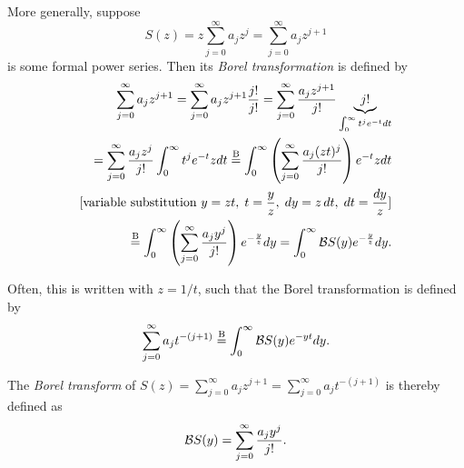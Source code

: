 More generally, suppose
\begin{equation}
S(z)= z \sum_{j=0}^\infty
a_j  z^j  = \sum_{j=0}^\infty
a_j  z^{j+1}
\label{2018-m-ch-ds-fps}
\end{equation}
is some formal power series.
Then  its {\em Borel transformation}
is defined by
\begin{equation}
\begin{split}
\sum_{j=0}^\infty
a_j z^{j+1}
=
\sum_{j=0}^\infty
a_j z^{j+1}  \frac{j!}{j!}
=
\sum_{j=0}^\infty
  \frac{a_j z^{j+1} }{j!}  \underbrace{j!}_{ \int_0^\infty t^j e^{-t}   dt }  \\
=
\sum_{j=0}^\infty
  \frac{a_jz^{j} }{j!}  \int_0^\infty t^j e^{-t} z dt
\stackrel{{\rm B}}{=}
\int_0^\infty \left(\sum_{j=0}^\infty   \frac{a_j (z t)^j}{j!}\right)  e^{-t} z dt \\
[\textrm{variable substitution }  y= z t, \; t = \frac{y}{z}  , \; dy = z \,dt, \; dt = \frac{dy}{z}]\\
\stackrel{{\rm B}}{=}
\int_0^\infty \left(\sum_{j=0}^\infty   \frac{a_j y^j}{j!}\right)  e^{-\frac{y}{z}}   dy  =
\int_0^\infty {\cal B}S (y)  e^{-\frac{y}{z}}   dy
.
\end{split}
\label{2012-m-ch-dsboreltrafo}
\end{equation}

Often, this is written with $z=1/t$, such that the  Borel transformation
is defined by
\begin{equation}
\begin{split}
\sum_{j=0}^\infty
a_j t^{-(j+1)}
\stackrel{{\rm B}}{=}
\int_0^\infty {\cal B}S (y)  e^{- yt }   dy
.
\end{split}
\label{2012-m-ch-dsboreltrafo2}
\end{equation}

The {\em Borel transform}
of   $S(z)=   \sum_{j=0}^\infty
a_j  z^{j+1} =  \sum_{j=0}^\infty
a_j  t^{-(j+1)}$
is thereby defined as
\begin{equation}
{\cal B}S (y)
=
  \sum_{j=0}^\infty   \frac{a_j y^j}{j!}
.
\label{2012-m-ch-dsboreltransform}
\end{equation}



